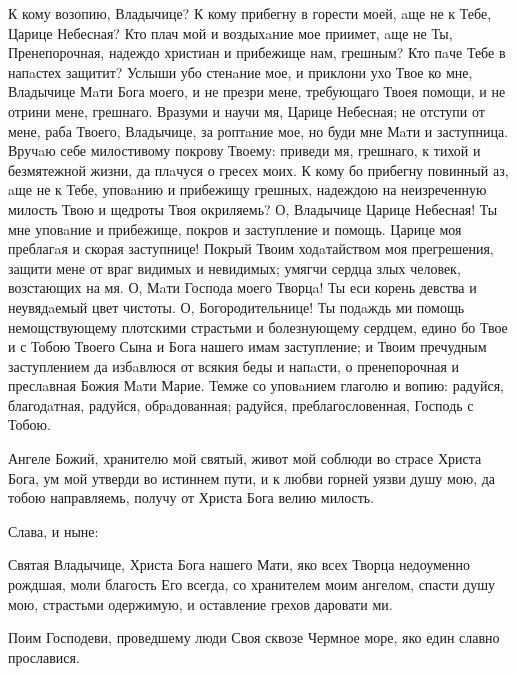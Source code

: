 К кому возопию, Владычице? К кому прибегну в горести моей, aще не к Тебе, Царице Небесная? Кто плач мой и воздыхaние мое приимет, aще не Ты, Пренепорочная, надеждо христиан и прибежище нам, грешным? Кто пaче Тебе в напaстех защитит? Услыши убо стенaние мое, и приклони ухо Твое ко мне, Владычице Мaти Бога моего, и не презри мене, требующаго Твоея помощи, и не отрини мене, грешнаго. Вразуми и научи мя, Царице Небесная; не отступи от мене, раба Твоего, Владычице, за роптaние мое, но буди мне Мaти и заступница. Вручaю себе милостивому покрову Твоему: приведи мя, грешнаго, к тихой и безмятежной жизни, да плaчуся о гресех моих. К кому бо прибегну повинный аз, aще не к Тебе, уповaнию и прибежищу грешных, надеждою на неизреченную милость Твою и щедроты Твоя окриляемь? О, Владычице Царице Небесная! Ты мне уповaние и прибежище, покров и заступление и помощь. Царице моя преблагaя и скорая заступнице! Покрый Твоим ходaтайством моя прегрешения, защити мене от враг видимых и невидимых; умягчи сердца злых человек, возстающих на мя. О, Мaти Господа моего Творцa! Ты еси корень девства и неувядaемый цвет чистоты. О, Богородительнице! Ты подaждь ми помощь немощствующему плотскими страстьми и болезнующему сердцем, едино бо Твое и с Тобою Твоего Сына и Бога нашего имам заступление; и Твоим пречудным заступлением да избaвлюся от всякия беды и напaсти, о пренепорочная и преслaвная Божия Мaти Марие. Темже со уповaнием глаголю и вопию: радуйся, благодaтная, радуйся, обрaдованная; радуйся, преблагословенная, Господь с Тобою.

\mychapterending

 

Ангеле Божий, хранителю мой святый, живот мой соблюди во страсе Христа Бога, ум мой утверди во истиннем пути, и к любви горней уязви душу мою, да тобою направляемь, получу от Христа Бога велию милость.


Слава, и ныне:

\medskip
Святая Владычице, Христа Бога нашего Мати, яко всех Творца недоуменно рождшая, моли благость Его всегда, со хранителем моим ангелом, спасти душу мою, страстьми одержимую, и оставление грехов даровати ми.


\medskip



\medskip



  Поим Господеви, проведшему люди Своя сквозе Чермное море, яко един славно прославися.



